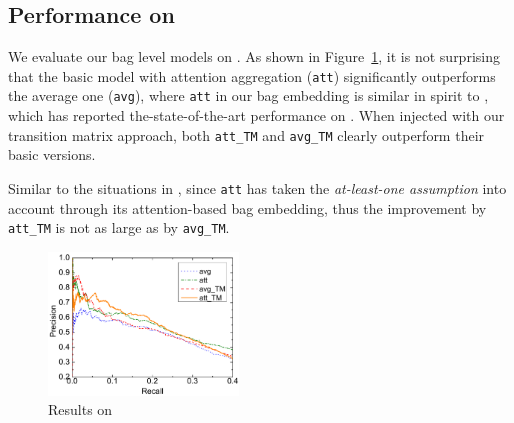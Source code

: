 \subsection{Performance on \EntityRE}
We evaluate our bag level models on \EntityRE. 
As shown in Figure~\ref{fig: Riedel_res}, it is not surprising that the basic model with attention aggregation (\texttt{att}) significantly outperforms the average one (\texttt{avg}), where \texttt{att}  in our bag embedding is similar in spirit to \cite{lin2016neural},
which has reported the-state-of-the-art performance on \EntityRE.  
When injected with our transition matrix approach,  both \texttt{att\_TM} and \texttt{avg\_TM} clearly outperform their basic versions.

Similar to the situations in \TimeRE, since  \texttt{att} has taken the \textit{at-least-one assumption} into account  through its attention-based bag embedding, thus the improvement by \texttt{att\_TM}  is not as large as by \texttt{avg\_TM}.

\begin{figure}[t!]
\setlength{\abovecaptionskip}{3pt}
\includegraphics[width=0.45\textwidth]{figures/re_att_avg_cmp_exp.pdf}
\caption{Results on \EntityRE}
\label{fig: Riedel_res}
\end{figure}



